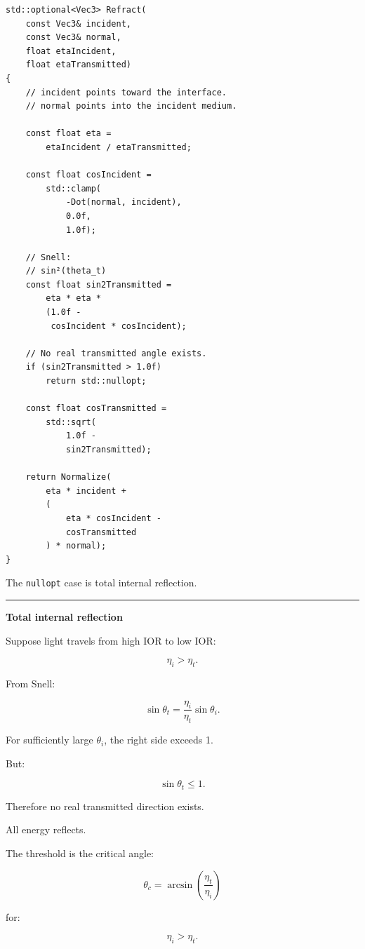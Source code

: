 \begin{verbatim}
std::optional<Vec3> Refract(
    const Vec3& incident,
    const Vec3& normal,
    float etaIncident,
    float etaTransmitted)
{
    // incident points toward the interface.
    // normal points into the incident medium.

    const float eta =
        etaIncident / etaTransmitted;

    const float cosIncident =
        std::clamp(
            -Dot(normal, incident),
            0.0f,
            1.0f);

    // Snell:
    // sin²(theta_t)
    const float sin2Transmitted =
        eta * eta *
        (1.0f -
         cosIncident * cosIncident);

    // No real transmitted angle exists.
    if (sin2Transmitted > 1.0f)
        return std::nullopt;

    const float cosTransmitted =
        std::sqrt(
            1.0f -
            sin2Transmitted);

    return Normalize(
        eta * incident +
        (
            eta * cosIncident -
            cosTransmitted
        ) * normal);
}
\end{verbatim}

The \texttt{nullopt} case is total internal reflection.

\begin{center}\rule{0.5\linewidth}{0.5pt}\end{center}

\textbf{Total internal reflection}

Suppose light travels from high IOR to low IOR:

\[
\eta_i>\eta_t.
\]

From Snell:

\[
\sin\theta_t
=
\frac{\eta_i}{\eta_t}
\sin\theta_i.
\]

For sufficiently large \(\theta_i\), the right side exceeds 1.

But:

\[
\sin\theta_t\le1.
\]

Therefore no real transmitted direction exists.

All energy reflects.

The threshold is the critical angle:

\[
\boxed{
\theta_c=
\arcsin
\left(
\frac{\eta_t}{\eta_i}
\right)
}
\]

for:

\[
\eta_i>\eta_t.
\]


